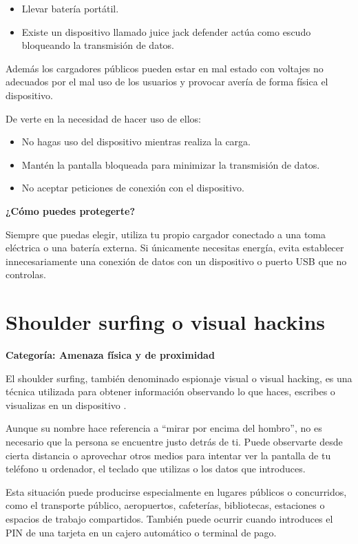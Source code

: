 \documentclass[
  spanish,
  a4paper,
  openany]{book}
\begin{document}
\begin{itemize}
\item
  Llevar batería portátil.
\item
  Existe un dispositivo llamado juice jack defender actúa como escudo bloqueando la transmisión de datos.
\end{itemize}

Además los cargadores públicos pueden estar en mal estado con voltajes no adecuados por el mal uso de los usuarios y provocar avería de forma física el dispositivo.

De verte en la necesidad de hacer uso de ellos:

\begin{itemize}
\item
  No hagas uso del dispositivo mientras realiza la carga.
\item
  Mantén la pantalla bloqueada para minimizar la transmisión de datos.
\item
  No aceptar peticiones de conexión con el dispositivo.
\end{itemize}

\textbf{¿Cómo puedes protegerte?}

Siempre que puedas elegir, utiliza tu propio cargador conectado a una toma eléctrica o una batería externa. Si únicamente necesitas energía, evita establecer innecesariamente una conexión de datos con un dispositivo o puerto USB que no controlas.

\section{Shoulder surfing o visual hackins}\label{shoulder-surfing-o-visual-hackins}

\textbf{Categoría: Amenaza física y de proximidad}

El shoulder surfing, también denominado espionaje visual o visual hacking, es una técnica utilizada para obtener información observando lo que haces, escribes o visualizas en un dispositivo \citep{INCIBE-shoulder-surfing}.

Aunque su nombre hace referencia a ``mirar por encima del hombro'', no es necesario que la persona se encuentre justo detrás de ti. Puede observarte desde cierta distancia o aprovechar otros medios para intentar ver la pantalla de tu teléfono u ordenador, el teclado que utilizas o los datos que introduces.

Esta situación puede producirse especialmente en lugares públicos o concurridos, como el transporte público, aeropuertos, cafeterías, bibliotecas, estaciones o espacios de trabajo compartidos. También puede ocurrir cuando introduces el PIN de una tarjeta en un cajero automático o terminal de pago.
\end{document}
